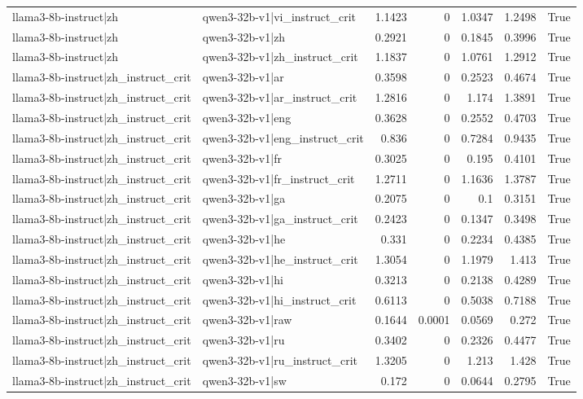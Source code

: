 \begin{table}
\begin{tabular}{l l r r r r l}
llama3-8b-instruct|zh & qwen3-32b-v1|vi_instruct_crit & 1.1423 & 0 & 1.0347 & 1.2498 & True \\
llama3-8b-instruct|zh & qwen3-32b-v1|zh & 0.2921 & 0 & 0.1845 & 0.3996 & True \\
llama3-8b-instruct|zh & qwen3-32b-v1|zh_instruct_crit & 1.1837 & 0 & 1.0761 & 1.2912 & True \\
llama3-8b-instruct|zh_instruct_crit & qwen3-32b-v1|ar & 0.3598 & 0 & 0.2523 & 0.4674 & True \\
llama3-8b-instruct|zh_instruct_crit & qwen3-32b-v1|ar_instruct_crit & 1.2816 & 0 & 1.174 & 1.3891 & True \\
llama3-8b-instruct|zh_instruct_crit & qwen3-32b-v1|eng & 0.3628 & 0 & 0.2552 & 0.4703 & True \\
llama3-8b-instruct|zh_instruct_crit & qwen3-32b-v1|eng_instruct_crit & 0.836 & 0 & 0.7284 & 0.9435 & True \\
llama3-8b-instruct|zh_instruct_crit & qwen3-32b-v1|fr & 0.3025 & 0 & 0.195 & 0.4101 & True \\
llama3-8b-instruct|zh_instruct_crit & qwen3-32b-v1|fr_instruct_crit & 1.2711 & 0 & 1.1636 & 1.3787 & True \\
llama3-8b-instruct|zh_instruct_crit & qwen3-32b-v1|ga & 0.2075 & 0 & 0.1 & 0.3151 & True \\
llama3-8b-instruct|zh_instruct_crit & qwen3-32b-v1|ga_instruct_crit & 0.2423 & 0 & 0.1347 & 0.3498 & True \\
llama3-8b-instruct|zh_instruct_crit & qwen3-32b-v1|he & 0.331 & 0 & 0.2234 & 0.4385 & True \\
llama3-8b-instruct|zh_instruct_crit & qwen3-32b-v1|he_instruct_crit & 1.3054 & 0 & 1.1979 & 1.413 & True \\
llama3-8b-instruct|zh_instruct_crit & qwen3-32b-v1|hi & 0.3213 & 0 & 0.2138 & 0.4289 & True \\
llama3-8b-instruct|zh_instruct_crit & qwen3-32b-v1|hi_instruct_crit & 0.6113 & 0 & 0.5038 & 0.7188 & True \\
llama3-8b-instruct|zh_instruct_crit & qwen3-32b-v1|raw & 0.1644 & 0.0001 & 0.0569 & 0.272 & True \\
llama3-8b-instruct|zh_instruct_crit & qwen3-32b-v1|ru & 0.3402 & 0 & 0.2326 & 0.4477 & True \\
llama3-8b-instruct|zh_instruct_crit & qwen3-32b-v1|ru_instruct_crit & 1.3205 & 0 & 1.213 & 1.428 & True \\
llama3-8b-instruct|zh_instruct_crit & qwen3-32b-v1|sw & 0.172 & 0 & 0.0644 & 0.2795 & True \\

\end{tabular}
\end{table}
